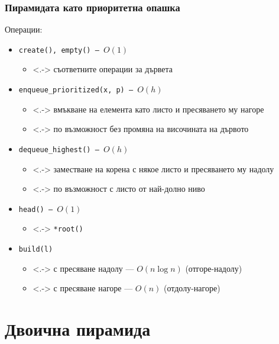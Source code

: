 \documentclass[alsotrans,beameroptions={aspectratio=169}]{beamerswitch}
\begin{document}
\begin{frame}
  \frametitle{Пирамидата като приоритетна опашка}

  Операции:
  \begin{itemize}[<+->]
  \item \tt{create()}, \tt{empty()} --- $O(1)$
    \begin{itemize}
    \item<.-> съответните операции за дървета
    \end{itemize}
  \item \tt{enqueue\_prioritized(x, p)} --- $O(h)$
    \begin{itemize}
    \item<.-> вмъкване на елемента като листо и пресяването му нагоре
    \item<.-> по възможност без промяна на височината на дървото
    \end{itemize}
  \item \tt{dequeue\_highest()} --- $O(h)$
    \begin{itemize}
    \item<.-> заместване на корена с някое листо и пресяването му надолу
    \item<.-> по възможност с листо от най-долно ниво
    \end{itemize}
  \item \tt{head()} --- $O(1)$
    \begin{itemize}
    \item<.-> \tt{*root()}
    \end{itemize}
  \item \tt{build(l)}
    \begin{itemize}
    \item<.-> с пресяване надолу --- $O(n\log n)$ (отгоре-надолу)
    \item<.-> с пресяване нагоре  --- $O(n)$ (отдолу-нагоре)
    \end{itemize}
  \end{itemize}
\end{frame}

\section{Двоична пирамида}
\end{document}

